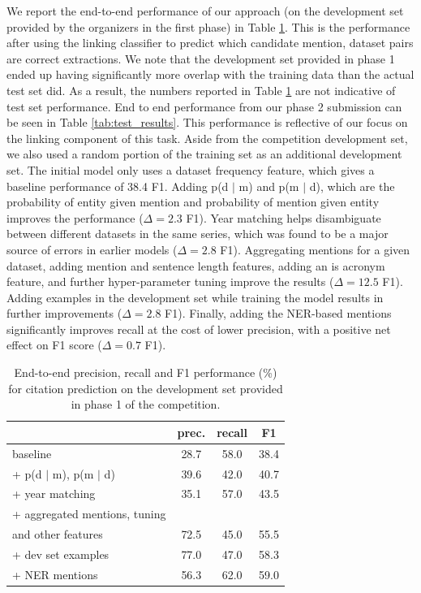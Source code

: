 We report the end-to-end performance of our approach (on the development set provided by the organizers in the first phase) in Table \ref{tab:e2e_results}. This is the performance after using the linking classifier to predict which candidate mention, dataset pairs are correct extractions.
We note that the development set provided in phase 1 ended up having significantly more overlap with the training data than the actual test set did. As a result, the numbers reported in Table \ref{tab:e2e_results} are not indicative of test set performance. End to end performance from our phase 2 submission can be seen in Table \ref{tab:test_results}. This performance is reflective of our focus on the linking component of this task. Aside from the competition development set, we also used a random portion of the training set as an additional development set.
The initial model only uses a dataset frequency feature, which gives a baseline performance of 38.4 F1. Adding p(d $\mid$ m) and p(m $\mid$ d), which are the probability of entity given mention and probability of mention given entity improves the performance ($\Delta = 2.3$ F1).
Year matching helps disambiguate between different datasets in the same series, which was found to be a major source of errors in earlier models ($\Delta = 2.8$ F1).
Aggregating mentions for a given dataset, adding mention and sentence length features, adding an is acronym feature, and further hyper-parameter tuning improve the results ($\Delta = 12.5$ F1).
Adding examples in the development set while training the model results in further improvements ($\Delta = 2.8$ F1).
Finally, adding the NER-based mentions significantly improves recall at the cost of lower precision, with a positive net effect on F1 score ($\Delta = 0.7$ F1).

\begin{table}[t]
\centering
\setlength{\tabcolsep}{2pt}
\begin{tabular}{@{}lccc@{}}
\toprule
                  & prec. & recall & F1 \\ \midrule
baseline               & 28.7 & 58.0 & 38.4 \\
+ p(d $\mid$ m), p(m $\mid$ d)  & 39.6 & 42.0 & 40.7 \\
+ year matching        & 35.1 & 57.0 & 43.5 \\
+ aggregated mentions, tuning  & & & \\
\quad and other features & 72.5 & 45.0 & 55.5 \\
+ dev set examples     & 77.0 & 47.0 & 58.3 \\ 
+ NER mentions         & 56.3 & 62.0 & 59.0 \\ \bottomrule
\end{tabular}
\caption{End-to-end precision, recall and F1 performance (\%) for citation prediction on the development set provided in phase 1 of the competition. 
}
\label{tab:e2e_results}
\end{table}

